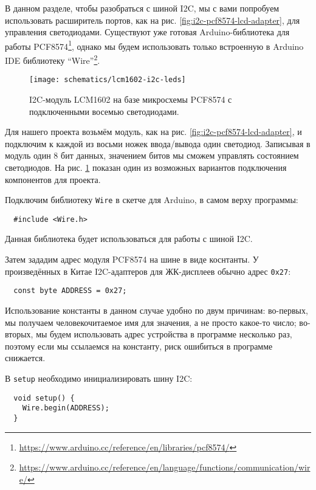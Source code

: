 \documentclass[../sparc.tex]{subfiles}
\begin{document}
В данном разделе, чтобы разобраться с шиной I2C, мы с вами попробуем
использовать расширитель портов, как на рис. \ref{fig:i2c-pcf8574-lcd-adapter},
для управления светодиодами.  Существуют уже готовая Arduino-библиотека для
работы
PCF8574\footnote{\url{https://www.arduino.cc/reference/en/libraries/pcf8574/}},
однако мы будем использовать только встроенную в Arduino IDE библиотеку
``Wire''\footnote{\url{https://www.arduino.cc/reference/en/language/functions/communication/wire/}}.

\begin{figure}[H]
  \centering
  \texttt{[image: schematics/lcm1602-i2c-leds]}
  \caption{I2C-модуль LCM1602 на базе микросхемы PCF8574 с подключенными восемью
    светодиодами.}
  \label{fig:lcm1602-i2c-leds}
\end{figure}

Для нашего проекта возьмём модуль, как на
рис. \ref{fig:i2c-pcf8574-lcd-adapter}, и подключим к каждой из восьми ножек
ввода/вывода один светодиод.  Записывая в модуль один 8 бит данных, значением
битов мы сможем управлять состоянием светодиодов.  На
рис. \ref{fig:lcm1602-i2c-leds} показан один из возможных вариантов подключения
компонентов для проекта.

Подключим библиотеку \texttt{Wire} в скетче для Arduino, в самом верху
программы:

\begin{verbatim}
  #include <Wire.h>
\end{verbatim}

Данная библиотека будет использоваться для работы с шиной I2C.

Затем зададим адрес модуля PCF8574 на шине в виде коснтанты.  У произведённых в
Китае I2C-адаптеров для ЖК-дисплеев обычно адрес \texttt{0x27}:

\begin{verbatim}
  const byte ADDRESS = 0x27;
\end{verbatim}

Использование константы в данном случае удобно по двум причинам: во-первых, мы
получаем человекочитаемое имя для значения, а не просто какое-то число;
во-вторых, мы будем использовать адрес устройства в программе несколько раз,
поэтому если мы ссылаемся на константу, риск ошибиться в программе снижается.

В \texttt{setup} необходимо инициализировать шину I2C:

\begin{verbatim}
  void setup() {
    Wire.begin(ADDRESS);
  }
\end{verbatim}
\end{document}
